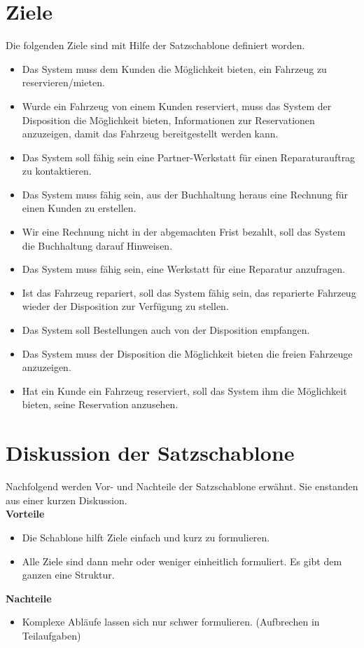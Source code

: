 \documentclass[12pt,a4paper,german]{article}
\author{Denis Augsburger, Piero Steinger, Thomas Wilde, Nicolas Mauchle }
\begin{document}

\newpage
\section{Ziele}
Die folgenden Ziele sind mit Hilfe der Satzschablone definiert worden.
\begin{itemize}
\item Das System muss dem Kunden die Möglichkeit bieten, ein Fahrzeug zu reservieren/mieten.
%
\item Wurde ein Fahrzeug von einem Kunden reserviert, muss das System der Disposition die Möglichkeit bieten, Informationen zur Reservationen anzuzeigen, damit das Fahrzeug bereitgestellt werden kann.
%
\item Das System soll fähig sein eine Partner-Werkstatt für einen Reparaturauftrag zu kontaktieren.
%
\item Das System muss fähig sein, aus der Buchhaltung heraus eine Rechnung für einen Kunden zu erstellen.
%
\item Wir eine Rechnung nicht in der abgemachten Frist bezahlt, soll das System die Buchhaltung darauf Hinweisen. 
%
\item Das System muss fähig sein, eine Werkstatt für eine Reparatur anzufragen.
%
\item Ist das Fahrzeug repariert, soll das System fähig sein, das reparierte Fahrzeug wieder der Disposition zur Verfügung  zu stellen.
%
\item Das System soll Bestellungen auch von der Disposition empfangen.
%
\item Das System muss der Disposition die Möglichkeit bieten die freien Fahrzeuge anzuzeigen.
%
\item Hat ein Kunde ein Fahrzeug reserviert, soll das System ihm die Möglichkeit bieten, seine Reservation anzusehen.
\end{itemize}
\newpage
\section{Diskussion der Satzschablone}
Nachfolgend werden Vor- und Nachteile der Satzschablone erwähnt. Sie enstanden aus einer kurzen Diskussion.\\[2ex]
\textbf{Vorteile}
\begin{itemize}
\item Die Schablone hilft Ziele einfach und kurz zu formulieren.
\item Alle Ziele sind dann mehr oder weniger einheitlich formuliert. Es gibt dem ganzen eine Struktur.
\end{itemize}
%
\textbf{Nachteile}
\begin{itemize}
\item Komplexe Abläufe lassen sich nur schwer formulieren. (Aufbrechen in Teilaufgaben)
\end{itemize}
\end{document}
